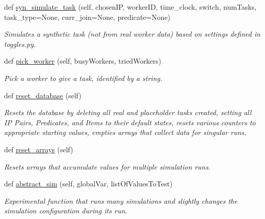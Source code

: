 \begin{DoxyCompactItemize}
def \mbox{\hyperlink{classdynamicfilterapp_1_1test__simulations_1_1_simulation_test_adb57a1130669e13cca7754f0a6ea040f}{syn\+\_\+simulate\+\_\+task}} (self, chosen\+IP, worker\+ID, time\+\_\+clock, switch, num\+Tasks, task\+\_\+type=None, curr\+\_\+join=None, predicate=None)
\begin{DoxyCompactList}\small\item\em Simulates a synthetic task (not from real worker data) based on settings defined in toggles.\+py. \end{DoxyCompactList}\item 
def \mbox{\hyperlink{classdynamicfilterapp_1_1test__simulations_1_1_simulation_test_acb17139f8e2f7a4b835ec1c05400e8c2}{pick\+\_\+worker}} (self, busy\+Workers, tried\+Workers)
\begin{DoxyCompactList}\small\item\em Pick a worker to give a task, identified by a string. \end{DoxyCompactList}\item 
def \mbox{\hyperlink{classdynamicfilterapp_1_1test__simulations_1_1_simulation_test_a5af6b7d43daa54fef6fc6580683e5c80}{reset\+\_\+database}} (self)
\begin{DoxyCompactList}\small\item\em Resets the database by deleting all real and placeholder tasks created, setting all IP Pairs, Predicates, and Items to their default states, resets various counters to appropriate starting values, empties arrays that collect data for singular runs. \end{DoxyCompactList}\item 
def \mbox{\hyperlink{classdynamicfilterapp_1_1test__simulations_1_1_simulation_test_a7226eb6e9e46f40e7b99f22aade32edf}{reset\+\_\+arrays}} (self)
\begin{DoxyCompactList}\small\item\em Resets arrays that accumulate values for multiple simulation runs. \end{DoxyCompactList}\item 
def \mbox{\hyperlink{classdynamicfilterapp_1_1test__simulations_1_1_simulation_test_a1e7e4ad765387840293e282eaf2b20bf}{abstract\+\_\+sim}} (self, global\+Var, list\+Of\+Values\+To\+Test)
\begin{DoxyCompactList}\small\item\em Experimental function that runs many simulations and slightly changes the simulation configuration during its run. \end{DoxyCompactList}\item 

\end{DoxyCompactItemize}
